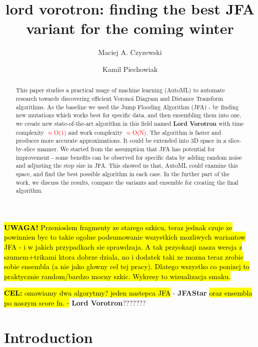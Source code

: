 \documentclass[format=acmsmall,screen,review,authordraft,nonacm]{acmart}
\title{lord vorotron: finding the best JFA variant for the coming winter} %
\author{Maciej A. Czyzewski}
\affiliation{%
 \institution{Poznan University of Technology}
 \city{Poznan}
 \country{Poland}}
\author{Kamil Piechowiak}
\affiliation{%
 \institution{Poznan University of Technology}
 \city{Poznan}
 \country{Poland}}
\newcommand{\ourjfasingle}{JFAStar}
\newcommand{\ourjfa}{Lord Vorotron} %
\begin{document}

\hl{\textbf{UWAGA!} Przenioslem fragmenty ze starego szkicu, teraz jednak czuje ze
powinnien byc to takie ogolne podsumowanie wszystkich mozliwych wariantow JFA - i
w jakich przypadkach sie sprawdzaja. A tak przyokazji nasza wersja z szumem+trikami
ktora dobrze dziala, no i dodatek taki ze mozna teraz zrobic sobie ensembla (a
nie jako glowny cel tej pracy). Dlatego wszystko co ponizej to praktycznie
random/bardzo mocny szkic. Wykresy to wizualizacja smaku.}
\newline

\begin{abstract}
This paper studies a practical usage of machine learning (AutoML) to automate
research towards discovering efficient Voronoi Diagram and Distance Transform
algorithms.  As the baseline we used the Jump Flooding Algorithm (JFA) - by
finding new mutations which works best for specific data, and then ensembling
them into one, we create new state-of-the-art algorithm in this field named
\textbf{\ourjfa} \hspace{0.01cm} with time complexity \textcolor{red}{$\approx$O(1)} and
work complexity \textcolor{red}{$\approx$O(N)}.
The algorithm is faster and produces more accurate approximations. It could be
extended into 3D space in a slice-by-slice manner.  We started from the
assumption that JFA has potential for improvement - some benefits can be
observed for specific data by adding random noise and adjusting the step size in
JFA.  This showed us that, AutoML could examine this space, and find the best
possible algorithm in each case.  In the further part of the work, we discuss
the results, compare the variants and ensemble for creating the final algorithm.
\end{abstract}

\maketitle

\hl{\textbf{CEL:} omawiamy dwa algorytmy? jeden nastepca JFA} -
\textbf{\ourjfasingle} \hspace{0.01cm} \hl{oraz ensembla po naszym score fn. -}
\textbf{\ourjfa}???????


\section{Introduction} %
\end{document}
